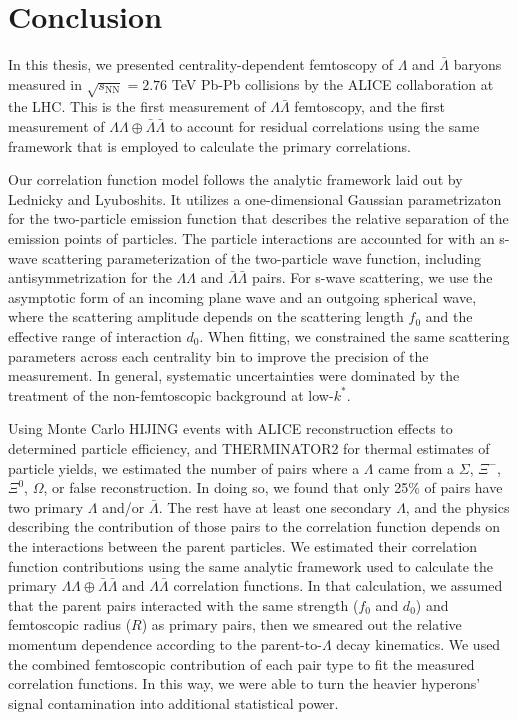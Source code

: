 \chapter{Conclusion}
\label{sec:Conclusion}

In this thesis, we presented centrality-dependent femtoscopy of $\Lambda$ and $\bar{\Lambda}$ baryons measured in $\sqrt{s_\mathrm{NN}} = 2.76$ TeV Pb-Pb collisions by the ALICE collaboration at the LHC.
This is the first measurement of $\Lambda\bar{\Lambda}$ femtoscopy, and the first measurement of $\Lambda\Lambda\oplus\bar{\Lambda}\bar{\Lambda}$ to account for residual correlations using the same framework that is employed to calculate the primary correlations.

Our correlation function model follows the analytic framework laid out by Lednicky and Lyuboshits.
It utilizes a one-dimensional Gaussian parametrizaton  for the two-particle emission function that describes the relative separation of the emission points of particles.
The particle interactions are accounted for with an s-wave scattering parameterization of the two-particle wave function, including antisymmetrization for the $\Lambda\Lambda$ and $\bar{\Lambda}\bar{\Lambda}$ pairs.
For s-wave scattering, we use the asymptotic form of an incoming plane wave and an outgoing spherical wave, where the scattering amplitude depends on the scattering length $f_0$ and the effective range of interaction $d_0$.
When fitting, we constrained the same scattering parameters across each centrality bin to improve the precision of the measurement.
In general, systematic uncertainties were dominated by the treatment of the non-femtoscopic background at low-$k^*$.

Using Monte Carlo HIJING events with ALICE reconstruction effects to determined particle efficiency, and THERMINATOR2 for thermal estimates of particle yields, we estimated the number of pairs where a $\Lambda$ came from a $\Sigma$, $\Xi^-$, $\Xi^0$, $\Omega$, or false reconstruction. In doing so, we found that only 25\% of pairs have two primary $\Lambda$ and/or $\bar{\Lambda}$.
The rest have at least one secondary $\Lambda$, and the physics describing the contribution of those pairs to the correlation function depends on the interactions between the parent particles.
We estimated their correlation function contributions using the same analytic framework used to calculate the primary $\Lambda\Lambda\oplus\bar{\Lambda}\bar{\Lambda}$ and $\Lambda\bar{\Lambda}$ correlation functions.
In that calculation, we assumed that the parent pairs interacted with the same strength ($f_0$ and $d_0$) and femtoscopic radius ($R$) as primary pairs, then we smeared out the relative momentum dependence according to the parent-to-$\Lambda$ decay kinematics.
We used the combined femtoscopic contribution of each  pair type to fit the measured correlation functions.
In this way, we were able to turn the heavier hyperons' signal contamination into additional statistical power.

